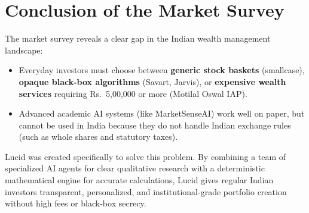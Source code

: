 \section{Conclusion of the Market Survey}
The market survey reveals a clear gap in the Indian wealth management landscape:
\begin{itemize}
    \item Everyday investors must choose between \textbf{generic stock baskets} (smallcase), \textbf{opaque black-box algorithms} (Savart, Jarvis), or \textbf{expensive wealth services} requiring Rs.~5,00,000 or more (Motilal Oswal IAP).
    \item Advanced academic AI systems (like MarketSenseAI) work well on paper, but cannot be used in India because they do not handle Indian exchange rules (such as whole shares and statutory taxes).
\end{itemize}

Lucid was created specifically to solve this problem. By combining a team of specialized AI agents for clear qualitative research with a deterministic mathematical engine for accurate calculations, Lucid gives regular Indian investors transparent, personalized, and institutional-grade portfolio creation without high fees or black-box secrecy.
